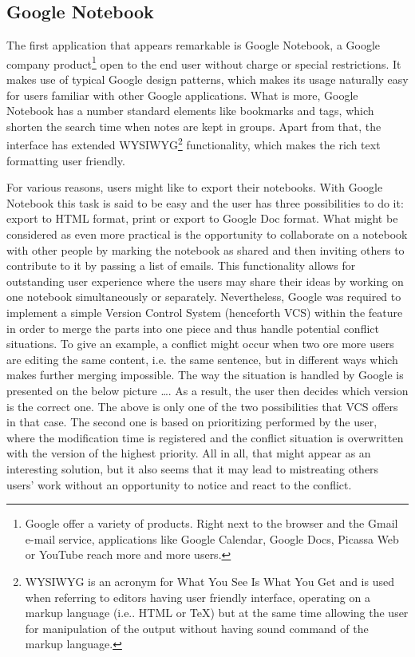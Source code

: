 \subsection{Google Notebook}\label{subsec:google_notebook}
The first application that appears remarkable is Google Notebook, a Google company product\footnote{Google offer a variety of products. Right next to the browser and the Gmail e-mail service, applications like Google Calendar, Google Docs, Picassa Web or YouTube reach more and more users.} open to the end user without charge or special restrictions. It makes use of typical Google design patterns, which makes its usage naturally easy for users familiar with other Google applications. What is more, Google Notebook has a number standard elements like bookmarks and tags, which shorten the search time when notes are kept in groups. Apart from that, the interface has extended WYSIWYG\footnote{WYSIWYG is an acronym for What You See Is What You Get and is used when referring to editors having user friendly interface, operating on a markup language (i.e.. HTML or \TeX) but at the same time allowing the user for manipulation of the output without having sound command of the markup language.} functionality, which makes the rich text formatting user friendly.

For various reasons, users might like to export their notebooks. With Google Notebook this task is said to be easy and the user has three possibilities to do it: export to HTML format, print or export to Google Doc format. What might be considered as even more practical is the opportunity to collaborate on a notebook with other people by marking the notebook as shared and then inviting others to contribute to it by passing a list of emails. This functionality allows for outstanding user experience where the users may share their ideas by working on one notebook simultaneously or separately. Nevertheless, Google was required to implement a simple Version Control System (henceforth VCS) within the feature in order to merge the parts into one piece and thus handle potential conflict situations. To give an example, a conflict might occur when two ore more users are editing the same content, i.e. the same sentence, but in different ways which makes further merging impossible. The way the situation is handled by Google is presented on the below picture \dots. As a result, the user then decides which version is the correct one. The above is only one of the two possibilities that VCS offers in that case. The second one is based on prioritizing performed by the user, where the modification time is registered and the conflict situation is overwritten with the version of the highest priority. All in all, that might appear as an interesting solution, but it also seems that it may lead to mistreating others users' work without an opportunity to notice and react to the conflict.

